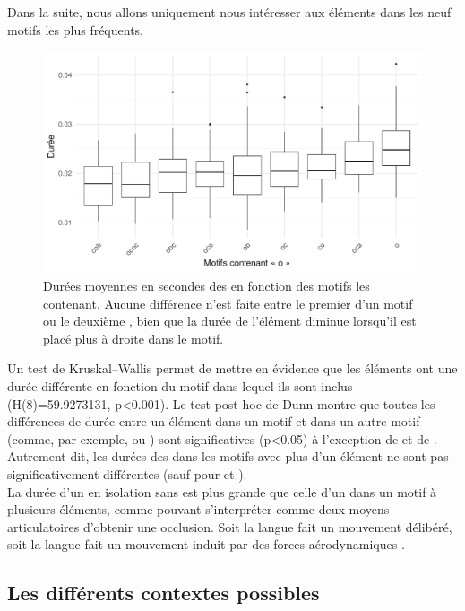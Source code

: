 Dans la suite, nous allons uniquement nous intéresser aux éléments  dans les neuf motifs les plus fréquents.\\

\begin{figure}
	\centering
	\includegraphics[width=0.7\linewidth]{substance/images/motifs_duree_o}
	\caption[Durées moyennes en secondes des  en fonction des motifs les contenant]{Durées moyennes en secondes des  en fonction des motifs les contenant. Aucune différence n'est faite entre le premier  d'un motif ou le deuxième , bien que la durée de l'élément  diminue lorsqu'il est placé plus à droite dans le motif.}
	\label{fig:motifsdureeo}
\end{figure}

Un test de Kruskal–Wallis permet de mettre en évidence que les éléments  ont une durée différente en fonction du motif dans lequel ils sont inclus (H(8)=59.9273131, p<0.001). Le test post-hoc de Dunn montre que toutes les différences de durée entre un élément  dans un motif  et dans un autre motif (comme, par exemple,  ou ) sont significatives (p<0.05) à l'exception de  et de . Autrement dit, les durées des  dans les motifs avec plus d'un élément ne sont pas significativement différentes (sauf pour  et ).\\

La durée d'un  en isolation sans  est plus grande que celle d'un  dans un motif à plusieurs éléments, comme  pouvant s'interpréter comme deux moyens articulatoires d'obtenir une occlusion. Soit la langue fait un mouvement délibéré, soit la langue fait un mouvement induit par des forces aérodynamiques \parencite{soleAerodynamicCharacteristicsTrills2002}.

\subsection{Les différents contextes possibles}


